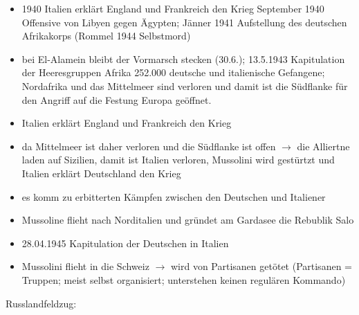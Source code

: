 \documentclass[a4paper,final]{book}
\begin{document}
	\begin{itemize}
	\item 1940 Italien erklärt England und Frankreich den Krieg September 1940 Offensive von Libyen gegen Ägypten; Jänner 1941 Aufstellung des deutschen
	Afrikakorps (Rommel 1944 Selbstmord)
	\item bei El-Alamein bleibt der Vormarsch stecken (30.6.); 13.5.1943 Kapitulation der Heeresgruppen Afrika 252.000 deutsche und italienische Gefangene;
	Nordafrika und das Mittelmeer sind verloren und damit ist die Südflanke für den Angriff auf die Festung Europa geöffnet.
	\item Italien erklärt England und Frankreich den Krieg
	\item da Mittelmeer ist daher verloren und die Südflanke ist offen $\rightarrow$ die Alliertne laden auf Sizilien, damit ist Italien verloren, 				Mussolini 
	wird gestürtzt und Italien erklärt Deutschland den Krieg
	\item es komm zu erbitterten Kämpfen zwischen den Deutschen und Italiener
	\item Mussoline flieht nach Norditalien und gründet am Gardasee die Rebublik Salo
	\item 28.04.1945 Kapitulation der Deutschen in Italien
	\item Mussolini flieht in die Schweiz $\rightarrow$ wird von Partisanen getötet (Partisanen = Truppen; meist selbst organisiert; unterstehen keinen 
	regulären Kommando)
	\end{itemize}

Russlandfeldzug:
\end{document}
